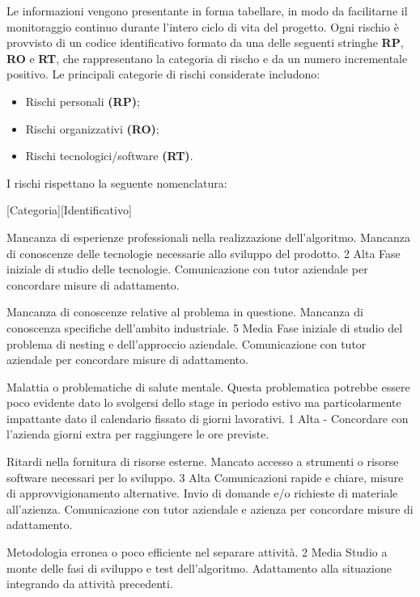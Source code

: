 Le informazioni vengono presentante in forma tabellare, in modo da facilitarne il monitoraggio continuo durante l’intero ciclo di vita del progetto. Ogni rischio è provvisto di un codice identificativo formato da una delle seguenti stringhe \textbf{RP}, \textbf{RO} e \textbf{RT}, che rappresentano la categoria di rischo e da un numero incrementale positivo. Le principali categorie di rischi considerate includono:
\begin{itemize}
    \item Rischi personali \textbf{(RP)};
    \item Rischi organizzativi \textbf{(RO)};
    \item Rischi tecnologici/software \textbf{(RT)}.
\end{itemize}
I rischi rispettano la seguente nomenclatura:
\begin{center}
    [Categoria][Identificativo]
\end{center}

{Mancanza di esperienze professionali nella realizzazione dell'algoritmo. Mancanza di conoscenze delle tecnologie necessarie allo sviluppo del prodotto.}
{2}
{Alta}
{Fase iniziale di studio delle tecnologie.}
{Comunicazione con tutor aziendale per concordare misure di adattamento.}

{Mancanza di conoscenze relative al problema in questione. Mancanza di conoscenza specifiche dell'ambito industriale.}
{5}
{Media}
{Fase iniziale di studio del problema di nesting e dell'approccio aziendale.}
{Comunicazione con tutor aziendale per concordare misure di adattamento.}

{Malattia o problematiche di salute mentale. Questa problematica potrebbe essere poco evidente dato lo svolgersi dello stage in periodo estivo ma particolarmente impattante dato il calendario fissato di giorni lavorativi.}
{1}
{Alta}
{-}
{Concordare con l'azienda giorni extra per raggiungere le ore previste.}

{Ritardi nella fornitura di risorse esterne. Mancato accesso a strumenti o risorse software necessari per lo sviluppo.}
{3}
{Alta}
{Comunicazioni rapide e chiare, misure di approvvigionamento alternative. Invio di domande e/o richieste di materiale all'azienza.}
{Comunicazione con tutor aziendale e azienza per concordare misure di adattamento.}

{Metodologia erronea o poco efficiente nel separare attività.}
{2}
{Media}
{Studio a monte delle fasi di sviluppo e test dell'algoritmo.}
{Adattamento alla situazione integrando da attività precedenti.}


